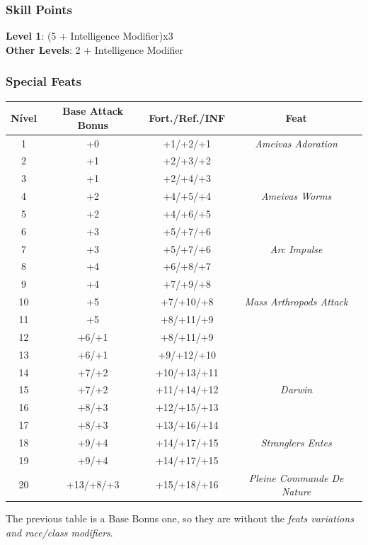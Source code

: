 \documentclass[ letterpaper,12pt]{article}
\begin{document}
\subsubsection{Skill Points}
{\bf Level 1}: (5 + Intelligence Modifier)x3\\
{\bf Other Levels}: 2 + Intelligence Modifier\\

\subsubsection{Special Feats}

\begin{center} \begin{tabular}{|c||c|c|c|}
\hline
{\bf Nível}&{\bf Base Attack Bonus}&{\bf Fort./Ref./INF}&{\bf Feat}\\
\hline
1&+0&+1/+2/+1&{\it Ameivas Adoration}\\
\hline
2&+1&+2/+3/+2&\\
\hline
3&+1&+2/+4/+3&\\
\hline
4&+2&+4/+5/+4&{\it Ameivas Worms}\\
\hline
5&+2&+4/+6/+5&{\it }\\
\hline
6&+3&+5/+7/+6&\\
\hline
7&+3&+5/+7/+6&{\it Arc Impulse}\\
\hline
8&+4&+6/+8/+7&\\
\hline
9&+4&+7/+9/+8&\\
\hline
10&+5&+7/+10/+8&{\it Mass Arthropods Attack}\\
\hline
11&+5&+8/+11/+9&\\
\hline
12&+6/+1&+8/+11/+9&\\
\hline
13&+6/+1&+9/+12/+10&\\
\hline
14&+7/+2&+10/+13/+11&\\
\hline
15&+7/+2&+11/+14/+12&{\it Darwin }\\
\hline
16&+8/+3&+12/+15/+13&\\
\hline
17&+8/+3&+13/+16/+14&\\
\hline
18&+9/+4&+14/+17/+15&{\it Stranglers Entes}\\
\hline
19&+9/+4&+14/+17/+15&\\
\hline
20&+13/+8/+3&+15/+18/+16&{\it Pleine Commande De Nature }\\
\hline
\end{tabular} \end{center}

The previous table is a Base Bonus one, so they are without the {\it feats variations and race/class modifiers}.\\
\end{document}

